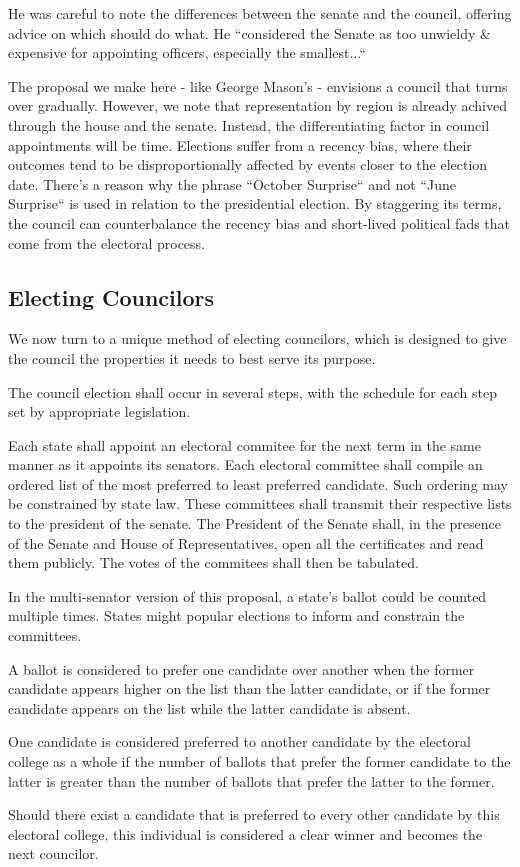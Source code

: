 \documentclass{article}
\begin{document}
He was careful to note the differences between the senate and the council, offering advice on which should do what. He “considered the Senate as too unwieldy \& expensive for appointing officers, especially the smallest...“

The proposal we make here - like George Mason's - envisions a council that turns over gradually. However, we note that representation by region is already achived through the house and the senate. Instead, the differentiating factor in council appointments will be time. Elections suffer from a recency bias, where their outcomes tend to be disproportionally affected by events closer to the election date. There's a reason why the phrase “October Surprise“ and not “June Surprise“ is used in relation to the presidential election. By staggering its terms, the council can counterbalance the recency bias and short-lived political fads that come from the electoral process.

\subsection{Electing Councilors}

We now turn to a unique method of electing councilors, which is designed to give the council the properties it needs to best serve its purpose.

\begin{quoting}
The council election shall occur in several steps, with the schedule for each step set by appropriate legislation.

Each state shall appoint an electoral commitee for the next term in the same manner as it appoints its senators. Each electoral committee shall compile an ordered list of the most preferred to least preferred candidate. Such ordering may be constrained by state law. These committees shall transmit their respective lists to the president of the senate.  The President of the Senate shall, in the presence of the Senate and House of Representatives, open all the certificates and read them publicly. The votes of the commitees shall then be tabulated.
\end{quoting}

In the multi-senator version of this proposal, a state's ballot could be counted multiple times. States might popular elections to inform and constrain the committees.

\begin{quoting}
A ballot is considered to prefer one candidate over another when the former candidate appears higher on the list than the latter candidate, or if the former candidate appears on the list while the latter candidate is absent.

One candidate is considered preferred to another candidate by the electoral college as a whole if the number of ballots that prefer the former candidate to the latter is greater than the number of ballots that prefer the latter to the former.

Should there exist a candidate that is preferred to every other candidate by this electoral college, this individual is considered a clear winner and becomes the next councilor.
\end{quoting}
\end{document}
